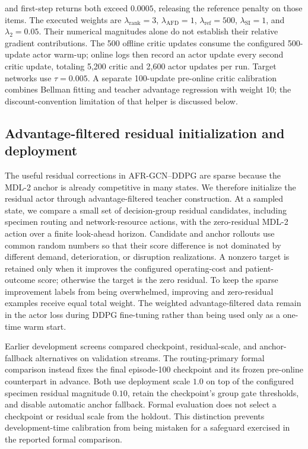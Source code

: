 \documentclass[preprint,review,12pt]{elsarticle}
\begin{document}
and first-step returns both exceed $0.0005$, releasing the reference penalty
on those items. The executed weights are
$\lambda_{\mathrm{rank}}=3$, $\lambda_{\mathrm{AFD}}=1$,
$\lambda_{\mathrm{ref}}=500$, $\lambda_{\mathrm{SI}}=1$, and $\lambda_2=0.05$.
Their numerical magnitudes alone do not establish their relative gradient
contributions. The 500 offline critic updates consume the configured
500-update actor warm-up; online logs then record an actor update every second
critic update, totaling 5,200 critic and 2,600 actor updates per run. Target
networks use $\tau=0.005$. A separate 100-update pre-online critic calibration
combines Bellman fitting and teacher advantage regression with weight 10;
the discount-convention limitation of that helper is discussed below.

\subsection*{Advantage-filtered residual initialization and deployment}
The useful residual corrections in AFR-GCN--DDPG are sparse because the MDL-2 anchor is already
competitive in many states. We therefore initialize the residual actor through
advantage-filtered teacher construction. At a sampled state, we compare a small set of
decision-group residual candidates, including specimen routing and network-resource actions, with the zero-residual
MDL-2 action over a finite look-ahead horizon. Candidate and anchor rollouts use
common random numbers so that their score difference is not dominated by
different demand, deterioration, or disruption realizations. A nonzero target
is retained only when it improves the configured operating-cost and
patient-outcome score; otherwise the target is the zero residual. To keep the
sparse improvement labels from being overwhelmed, improving and zero-residual
examples receive equal total weight. The weighted advantage-filtered data remain in the actor
loss during DDPG fine-tuning rather than being used only as a one-time warm
start.

Earlier development screens compared checkpoint, residual-scale, and
anchor-fallback alternatives on validation streams. The routing-primary
formal comparison instead fixes the final episode-100 checkpoint and its
frozen pre-online counterpart in advance. Both use deployment scale $1.0$
on top of the configured specimen residual magnitude $0.10$, retain the
checkpoint's group gate thresholds, and disable automatic anchor fallback.
Formal evaluation does not select a checkpoint or residual scale from the
holdout. This distinction prevents development-time calibration from being
mistaken for a safeguard exercised in the reported formal comparison.
\end{document}
